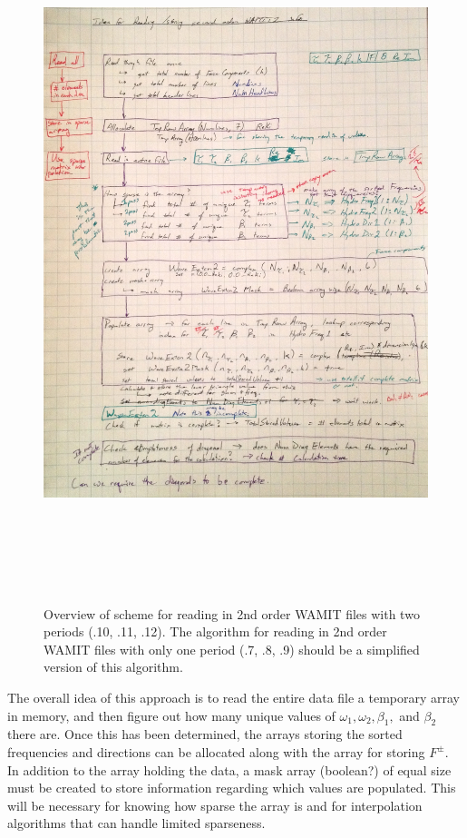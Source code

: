 \begin{figure}[H]
   \centering
   \includegraphics[height=8in]{chaps/figures/WAMIT2--read_Algorithm.jpg}
   \caption{Overview of scheme for reading in 2nd order WAMIT files with two periods (.10, .11, .12).  The algorithm for reading in 2nd order WAMIT files with only one period (.7, .8, .9) should be a simplified version of this algorithm.
      \label{fig:2ndOrdRead}}
\end{figure}

The overall idea of this approach is to read the entire data file a temporary array in memory, and then figure out how many unique values of $\omega_1, \omega_2, \beta_1,$ and $\beta_2$ there are.  Once this has been determined, the arrays storing the sorted frequencies and directions can be allocated along with the array for storing $F^\pm$.  In addition to the array holding the data, a mask array (boolean?) of equal size must be created to store information regarding which values are populated.  This will be necessary for knowing how sparse the array is and for interpolation algorithms that can handle limited sparseness.

